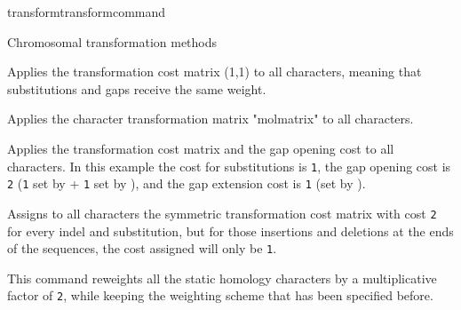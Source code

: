 \begin{command}{transform}{transformcommand}
\begin{arguments}
\begin{argumentgroup}{Chromosomal transformation methods}
\begin{description}
       
            \end{description}
        \end{argumentgroup}
	\end{arguments}
	


	\begin{poyexamples} 
             	{Applies the transformation cost matrix (1,1) to all characters,
             	meaning that substitutions and gaps receive the same weight.}

           	 {Applies the character transformation matrix "molmatrix" to all
            	characters.}
            	
		
		{Applies the transformation cost matrix and the gap opening cost
		to all characters. In this example the cost for substitutions is \texttt{1},
		the gap opening cost is \texttt{2} (\texttt{1} set by 
		+ \texttt{1} set by ), and the gap extension cost is \texttt{1}
		(set by ).}
		
		{Assigns to all characters the symmetric transformation cost
		matrix with cost \texttt{2} for every indel and substitution, but for those
		insertions and deletions at the ends of the sequences, the cost
		assigned will only be \texttt{1}.}
		
            	{This command reweights all the static homology characters
            	by a multiplicative factor of \texttt{2}, while keeping the weighting
            	scheme that has been specified before.}
		
		


\end{poyexamples}
\end{command}
